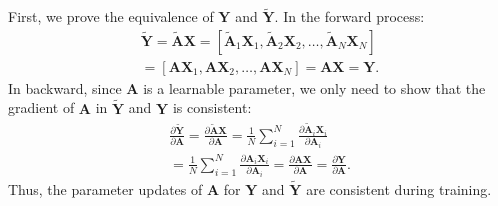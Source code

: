 \documentclass[10pt,twocolumn,letterpaper]{article}
\begin{document}
First, we prove the equivalence of $\mathbf{Y}$ and $\mathbf{\tilde{Y}}$. In the forward process:
\begin{equation}
\begin{split}
  \mathbf{\tilde{Y}}=\mathbf{\tilde{A}X}=\left[ {{{\mathbf{\tilde{A}}}}_{1}}{{\mathbf{X}}_{1}},{{{\mathbf{\tilde{A}}}}_{2}}{{\mathbf{X}}_{2}},\ldots ,{{{\mathbf{\tilde{A}}}}_{N}}{{\mathbf{X}}_{N}} \right] \\ 
 =\left[ \mathbf{A}{{\mathbf{X}}_{1}},\mathbf{A}{{\mathbf{X}}_{2}},\ldots ,\mathbf{A}{{\mathbf{X}}_{N}} \right]=\mathbf{AX}=\mathbf{Y}. 
\end{split}
\end{equation}
In backward, since $\mathbf{A}$ is a learnable parameter, we only need to show that the gradient of $\mathbf{A}$ in $\mathbf{\tilde{Y}}$ and $\mathbf{Y}$ is consistent:
\begin{equation}
\begin{split}
  \tfrac{\partial \mathbf{\tilde{Y}}}{\partial \mathbf{A}}=\tfrac{\partial \mathbf{\tilde{A}X}}{\partial \mathbf{A}}=\tfrac{1}{N}\sum\limits_{i=1}^{N}{\tfrac{\partial {{{\mathbf{\tilde{A}}}}_{i}}{{\mathbf{X}}_{i}}}{\partial {{\mathbf{A}}_{i}}}} \\ 
 =\tfrac{1}{N}\sum\limits_{i=1}^{N}{\tfrac{\partial {{\mathbf{A}}_{i}}{{\mathbf{X}}_{i}}}{\partial {{\mathbf{A}}_{i}}}}=\tfrac{\partial \mathbf{AX}}{\partial \mathbf{A}}=\tfrac{\partial \mathbf{Y}}{\partial \mathbf{A}}.
\end{split}
\label{equ:9}
\end{equation}
Thus, the parameter updates of $\mathbf{A}$ for $\mathbf{Y}$ and $\mathbf{\tilde{Y}}$ are consistent during training.
\end{document}
